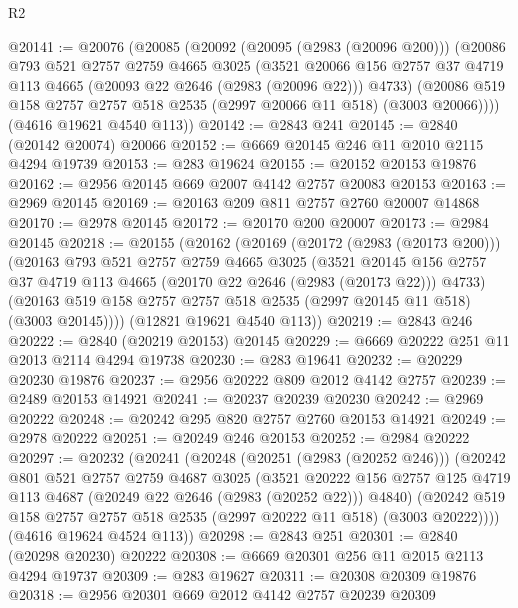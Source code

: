 \begin{lexlean}{R2}
\begin{coremodule}
@20141 := @20076
    (@20085
      (@20092
        (@20095 (@2983 (@20096 @200)))
        (@20086
          @793
          @521
          @2757
          @2759
          @4665
          @3025
          (@3521
            @20066
            @156
            @2757
            @37
            @4719
            @113
            @4665
            (@20093 @22 @2646 (@2983 (@20096 @22)))
            @4733)
          (@20086 @519 @158 @2757 @2757 @518 @2535 (@2997 @20066 @11 @518) (@3003 @20066))))
      (@4616 @19621 @4540 @113))
@20142 := @2843 @241
@20145 := @2840 (@20142 @20074) @20066
@20152 := @6669 @20145 @246 @11 @2010 @2115 @4294 @19739
@20153 := @283 @19624
@20155 := @20152 @20153 @19876
@20162 := @2956 @20145 @669 @2007 @4142 @2757 @20083 @20153
@20163 := @2969 @20145
@20169 := @20163 @209 @811 @2757 @2760 @20007 @14868
@20170 := @2978 @20145
@20172 := @20170 @200 @20007
@20173 := @2984 @20145
@20218 := @20155
    (@20162
      (@20169
        (@20172 (@2983 (@20173 @200)))
        (@20163
          @793
          @521
          @2757
          @2759
          @4665
          @3025
          (@3521
            @20145
            @156
            @2757
            @37
            @4719
            @113
            @4665
            (@20170 @22 @2646 (@2983 (@20173 @22)))
            @4733)
          (@20163 @519 @158 @2757 @2757 @518 @2535 (@2997 @20145 @11 @518) (@3003 @20145))))
      (@12821 @19621 @4540 @113))
@20219 := @2843 @246
@20222 := @2840 (@20219 @20153) @20145
@20229 := @6669 @20222 @251 @11 @2013 @2114 @4294 @19738
@20230 := @283 @19641
@20232 := @20229 @20230 @19876
@20237 := @2956 @20222 @809 @2012 @4142 @2757
@20239 := @2489 @20153 @14921
@20241 := @20237 @20239 @20230
@20242 := @2969 @20222
@20248 := @20242 @295 @820 @2757 @2760 @20153 @14921
@20249 := @2978 @20222
@20251 := @20249 @246 @20153
@20252 := @2984 @20222
@20297 := @20232
    (@20241
      (@20248
        (@20251 (@2983 (@20252 @246)))
        (@20242
          @801
          @521
          @2757
          @2759
          @4687
          @3025
          (@3521
            @20222
            @156
            @2757
            @125
            @4719
            @113
            @4687
            (@20249 @22 @2646 (@2983 (@20252 @22)))
            @4840)
          (@20242 @519 @158 @2757 @2757 @518 @2535 (@2997 @20222 @11 @518) (@3003 @20222))))
      (@4616 @19624 @4524 @113))
@20298 := @2843 @251
@20301 := @2840 (@20298 @20230) @20222
@20308 := @6669 @20301 @256 @11 @2015 @2113 @4294 @19737
@20309 := @283 @19627
@20311 := @20308 @20309 @19876
@20318 := @2956 @20301 @669 @2012 @4142 @2757 @20239 @20309

\end{coremodule}
\end{lexlean}
